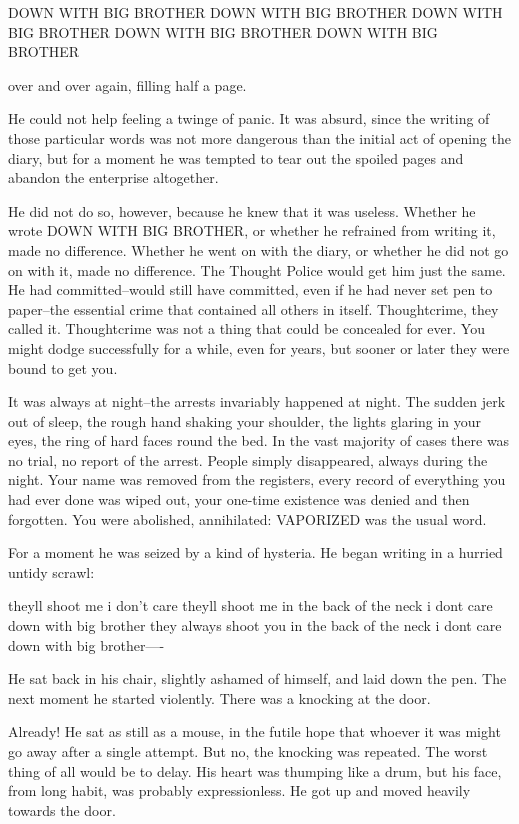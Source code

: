\documentclass{article}
\begin{document}
  DOWN WITH BIG BROTHER
  DOWN WITH BIG BROTHER
  DOWN WITH BIG BROTHER
  DOWN WITH BIG BROTHER
  DOWN WITH BIG BROTHER


over and over again, filling half a page.

He could not help feeling a twinge of panic. It was absurd, since the
writing of those particular words was not more dangerous than the initial
act of opening the diary, but for a moment he was tempted to tear out the
spoiled pages and abandon the enterprise altogether.

He did not do so, however, because he knew that it was useless. Whether he
wrote DOWN WITH BIG BROTHER, or whether he refrained from writing it, made
no difference. Whether he went on with the diary, or whether he did not go
on with it, made no difference. The Thought Police would get him just the
same. He had committed--would still have committed, even if he had never
set pen to paper--the essential crime that contained all others in itself.
Thoughtcrime, they called it. Thoughtcrime was not a thing that could be
concealed for ever. You might dodge successfully for a while, even for
years, but sooner or later they were bound to get you.

It was always at night--the arrests invariably happened at night. The
sudden jerk out of sleep, the rough hand shaking your shoulder, the lights
glaring in your eyes, the ring of hard faces round the bed. In the vast
majority of cases there was no trial, no report of the arrest. People
simply disappeared, always during the night. Your name was removed from the
registers, every record of everything you had ever done was wiped out, your
one-time existence was denied and then forgotten. You were abolished,
annihilated: VAPORIZED was the usual word.

For a moment he was seized by a kind of hysteria. He began writing in a
hurried untidy scrawl:


   theyll shoot me i don't care theyll shoot me in the back of the neck i
dont care down with big brother they always shoot you in the back of the
neck i dont care down with big brother----


He sat back in his chair, slightly ashamed of himself, and laid down
the pen. The next moment he started violently. There was a knocking at
the door.

Already! He sat as still as a mouse, in the futile hope that whoever it was
might go away after a single attempt. But no, the knocking was repeated.
The worst thing of all would be to delay. His heart was thumping like a
drum, but his face, from long habit, was probably expressionless. He got
up and moved heavily towards the door.
\end{document}
